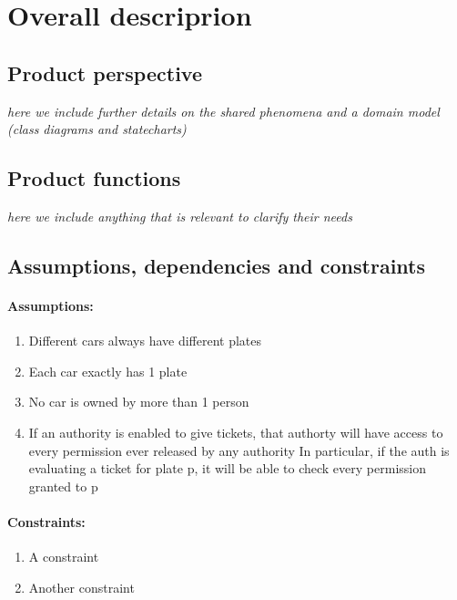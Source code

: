 \documentclass{article}
\newcommand{\enum}[1]{\texttt{#1.\arabic*}}
\begin{document}
\section{Overall descriprion}
	\subsection{Product perspective} \textit{here we include further details on the shared phenomena and a domain model (class diagrams and statecharts)}
	\subsection{Product functions}\textit{here we include anything that is relevant to clarify their needs}
	\subsection{Assumptions, dependencies and constraints}
	\paragraph{Assumptions:}
	\begin{enumerate}[label=\enum{A}]
		\item \label{A_disjPlates} Different cars always have different plates
		\item \label{A_Single plate}Each car exactly has 1 plate
		\item \label{A_singleOwner}No car is owned by more than 1 person
		\item \label{A_accessiblePermissions}If an authority is enabled to give tickets, that authorty will have access to every permission ever released by any authority
			\subitem In particular, if the auth is evaluating a ticket for plate p, it will be able to check every permission granted to p
	\end{enumerate}
	\paragraph{Constraints:}
	\begin{enumerate}[label=\enum{C}]
		\item A constraint
		\item Another constraint
	\end{enumerate}
\end{document}
